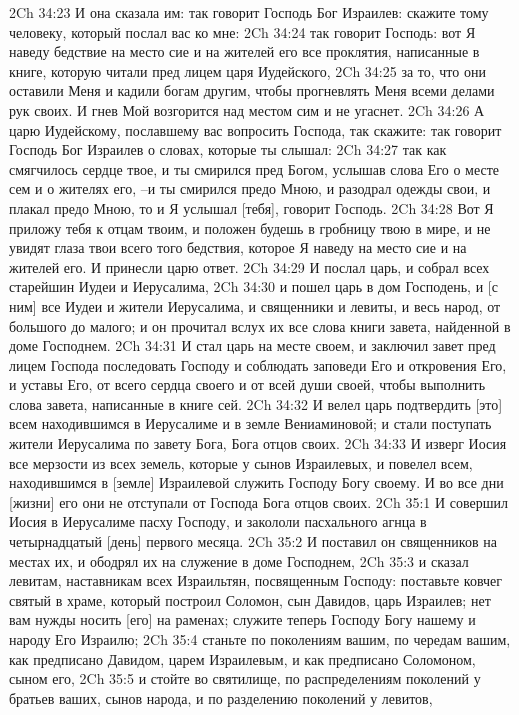 2Ch 34:23  И она сказала им: так говорит Господь Бог Израилев: скажите тому человеку, который послал вас ко мне:
2Ch 34:24  так говорит Господь: вот Я наведу бедствие на место сие и на жителей его все проклятия, написанные в книге, которую читали пред лицем царя Иудейского,
2Ch 34:25  за то, что они оставили Меня и кадили богам другим, чтобы прогневлять Меня всеми делами рук своих. И гнев Мой возгорится над местом сим и не угаснет.
2Ch 34:26  А царю Иудейскому, пославшему вас вопросить Господа, так скажите: так говорит Господь Бог Израилев о словах, которые ты слышал:
2Ch 34:27  так как смягчилось сердце твое, и ты смирился пред Богом, услышав слова Его о месте сем и о жителях его, --и ты смирился предо Мною, и разодрал одежды свои, и плакал предо Мною, то и Я услышал [тебя], говорит Господь.
2Ch 34:28  Вот Я приложу тебя к отцам твоим, и положен будешь в гробницу твою в мире, и не увидят глаза твои всего того бедствия, которое Я наведу на место сие и на жителей его. И принесли царю ответ.
2Ch 34:29  И послал царь, и собрал всех старейшин Иудеи и Иерусалима,
2Ch 34:30  и пошел царь в дом Господень, и [с ним] все Иудеи и жители Иерусалима, и священники и левиты, и весь народ, от большого до малого; и он прочитал вслух их все слова книги завета, найденной в доме Господнем.
2Ch 34:31  И стал царь на месте своем, и заключил завет пред лицем Господа последовать Господу и соблюдать заповеди Его и откровения Его, и уставы Его, от всего сердца своего и от всей души своей, чтобы выполнить слова завета, написанные в книге сей.
2Ch 34:32  И велел царь подтвердить [это] всем находившимся в Иерусалиме и в земле Вениаминовой; и стали поступать жители Иерусалима по завету Бога, Бога отцов своих.
2Ch 34:33  И изверг Иосия все мерзости из всех земель, которые у сынов Израилевых, и повелел всем, находившимся в [земле] Израилевой служить Господу Богу своему. И во все дни [жизни] его они не отступали от Господа Бога отцов своих.
2Ch 35:1  И совершил Иосия в Иерусалиме пасху Господу, и закололи пасхального агнца в четырнадцатый [день] первого месяца.
2Ch 35:2  И поставил он священников на местах их, и ободрял их на служение в доме Господнем,
2Ch 35:3  и сказал левитам, наставникам всех Израильтян, посвященным Господу: поставьте ковчег святый в храме, который построил Соломон, сын Давидов, царь Израилев; нет вам нужды носить [его] на раменах; служите теперь Господу Богу нашему и народу Его Израилю;
2Ch 35:4  станьте по поколениям вашим, по чередам вашим, как предписано Давидом, царем Израилевым, и как предписано Соломоном, сыном его,
2Ch 35:5  и стойте во святилище, по распределениям поколений у братьев ваших, сынов народа, и по разделению поколений у левитов,
